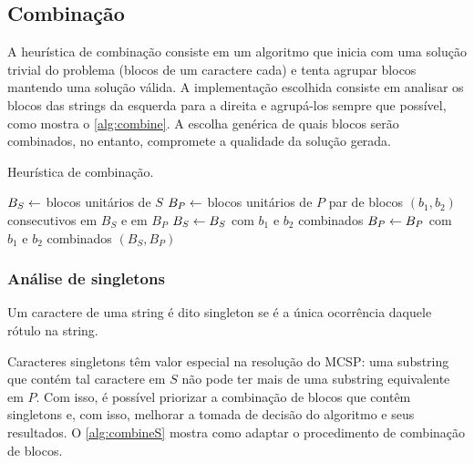 
\subsection{Combinação}

    A heurística de combinação consiste em um algoritmo que inicia com uma solução trivial do problema (blocos de um caractere cada) e tenta agrupar blocos mantendo uma solução válida. A implementação escolhida consiste em analisar os blocos das strings da esquerda para a direita e agrupá-los sempre que possível, como mostra o \cref{alg:combine}. A escolha genérica de quais blocos serão combinados, no entanto, compromete a qualidade da solução gerada.

    \begin{algorithm}
        \caption{Heurística de combinação.} \label{alg:combine}
        \begin{codebox}
        \li $B_S \leftarrow$ blocos unitários de $S$
        \li $B_P \leftarrow$ blocos unitários de $P$
        \li \Para \Cada par de blocos $(b_1, b_2)$ consecutivos em $B_S$ e em $B_P$ \Faca
            \Do
        \li     $B_S \leftarrow B_S$ com $b_1$ e $b_2$ combinados
        \li     $B_P \leftarrow B_P$ com $b_1$ e $b_2$ combinados
            \End
        \li \Devolva $(B_S, B_P)$
        \end{codebox}
    \end{algorithm}

    \subsubsection{Análise de singletons}
    
        \begin{definition}[Singleton]
            Um caractere de uma string é dito singleton se é a única ocorrência daquele rótulo na string.
        \end{definition}

        Caracteres singletons têm valor especial na resolução do MCSP: uma substring que contém tal caractere em $S$ não pode ter mais de uma substring equivalente em $P$. Com isso, é possível priorizar a combinação de blocos que contêm singletons e, com isso, melhorar a tomada de decisão do algoritmo e seus resultados. O \cref{alg:combineS} mostra como adaptar o procedimento de combinação de blocos.

